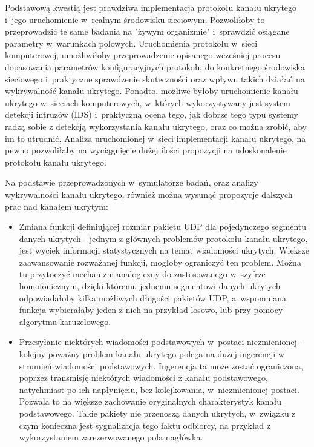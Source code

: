 \documentclass[a4paper, twoside, openright, 12pt]{report}
\begin{document}
    Podstawową kwestią jest prawdziwa implementacja protokołu kanału ukrytego
    i~jego uruchomienie w~realnym środowisku sieciowym. Pozwoliłoby to przeprowadzić
    te same badania na "żywym organizmie" i~sprawdzić osiągane parametry w~warunkach polowych.
    Uruchomienia protokołu w~sieci komputerowej, umożliwiłoby przeprowadzenie opisanego
    wcześniej procesu dopasowania parametrów konfiguracyjnych protokołu do konkretnego
    środowiska sieciowego i~praktyczne sprawdzenie skuteczności oraz wpływu takich
    działań na wykrywalność kanału ukrytego. Ponadto, możliwe byłoby uruchomienie
    kanału ukrytego w~sieciach komputerowych, w~których wykorzystywany jest system
    detekcji intruzów (IDS) i~praktyczną ocena tego, jak dobrze tego typu systemy
    radzą sobie z detekcją wykorzystania kanału ukrytego, oraz co można zrobić,
    aby im to utrudnić. Analiza uruchomionej w~sieci implementacji kanału ukrytego,
    na pewno pozwoliłaby na wyciągnięcie dużej ilości propozycji na udoskonalenie
    protokołu kanału ukrytego.

    Na podstawie przeprowadzonych w~symulatorze badań, oraz analizy wykrywalności
    kanału ukrytego, również można wysunąć propozycje dalszych prac nad kanałem ukrytym:

    \begin{itemize}
        \item Zmiana funkcji definiującej rozmiar pakietu UDP dla pojedynczego segmentu danych ukrytych -
            jednym z głównych problemów protokołu kanału ukrytego, jest wyciek
            informacji statystycznych na temat wiadomości ukrytych.
            Większe zaawansowanie rozważanej funkcji, mogłoby ograniczyć ten problem.
            Można tu przytoczyć mechanizm analogiczny do zastosowanego w~szyfrze
            homofonicznym, dzięki któremu jednemu segmentowi danych ukrytych
            odpowiadałoby kilka możliwych długości pakietów UDP, a~wspomniana funkcja
            wybierałaby jeden z nich na przykład losowo, lub przy pomocy algorytmu
            karuzelowego.
        \item Przesyłanie niektórych wiadomości podstawowych w~postaci niezmienionej -
            kolejny poważny problem kanału ukrytego polega na dużej ingerencji w
            strumień wiadomości podstawowych. Ingerencja ta może zostać ograniczona, poprzez
            transmisję niektórych wiadomości z kanału podstawowego, natychmiast
            po ich napłynięciu, bez kolejkowania, w~niezmienionej postaci.
            Pozwala to na większe zachowanie oryginalnych charakterystyk kanału
            podstawowego. Takie pakiety nie przenoszą danych ukrytych, w~związku
            z czym konieczna jest sygnalizacja tego faktu odbiorcy, na przykład
            z wykorzystaniem zarezerwowanego pola nagłówka.
    \end{itemize}

\clearpage
{}


\end{document}
